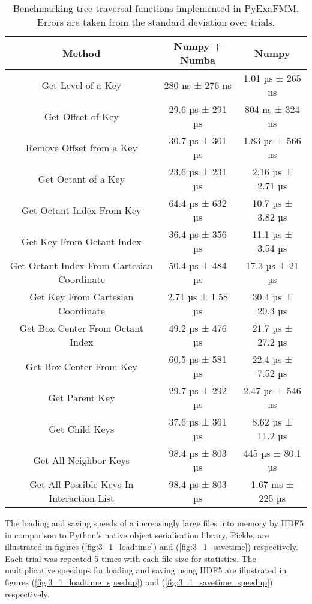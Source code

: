 \begin{table}[ht]
    \centering %
    \begin{tabular}{c c c} %
    \hline\hline %
    Method & Numpy + Numba & Numpy \\ [0.5ex] %
    \hline %
    Get Level of a Key & 280 ns ± 276 ns  & 1.01 µs ± 265 ns \\ %
    Get Offset of Key & 29.6 µs ± 291 µs & 804 ns ± 324 ns \\
    Remove Offset from a Key & 30.7 µs ± 301 µs & 1.83 µs ± 566 ns \\
    Get Octant of a Key & 23.6 µs ± 231 µs & 2.16 µs ± 2.71 µs \\
    Get Octant Index From Key & 64.4 µs ± 632 µs & 10.7 µs ± 3.82 µs \\
    Get Key From Octant Index & 36.4 µs ± 356 µs & 11.1 µs ± 3.54 µs \\
    Get Octant Index From Cartesian Coordinate & 50.4 µs ± 484 µs & 17.3 µs ± 21 µs \\
    Get Key From Cartesian Coordinate & 2.71 µs ± 1.58 µs & 30.4 µs ± 20.3 µs \\
    Get Box Center From Octant Index & 49.2 µs ± 476 µs & 21.7 µs ± 27.2 µs \\
    Get Box Center From Key & 60.5 µs ± 581 µs & 22.4 µs ± 7.52 µs \\
    Get Parent Key & 29.7 µs ± 292 µs & 2.47 µs ± 546 ns \\
    Get Child Keys & 37.6 µs ± 361 µs & 8.62 µs ± 11.2 µs \\
    Get All Neighbor Keys & 98.4 µs ± 803 µs & 445 µs ± 80.1 µs\\
    Get All Possible Keys In Interaction List & 98.4 µs ± 803 µs & 1.67 ms ± 225 µs \\ [1ex] %
    \hline %
    \end{tabular}
    \label{table:3_1_jit} %
    \caption{
        Benchmarking tree traversal functions implemented in \gls{PyExaFMM}.
        Errors are taken from the standard deviation over trials.
        } %
\end{table}


The loading and saving speeds of a increasingly large files into memory by
HDF5 in comparison to Python's native object serialisation library, Pickle,
are illustrated in figures (\ref{fig:3_1_loadtime}) and (\ref{fig:3_1_savetime})
respectively. Each trial was repeated 5 times with each file size for statistics.
The multiplicative speedups for loading and saving using HDF5 are illustrated
in figures (\ref{fig:3_1_loadtime_speedup}) and (\ref{fig:3_1_savetime_speedup})
respectively.

